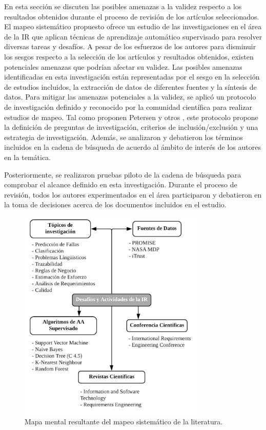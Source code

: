 \documentclass[journal]{IEEEtran}
\begin{document}
En esta sección se discuten las posibles amenazas a la validez respecto a los resultados obtenidos durante el proceso de revisión de los artículos seleccionados. El mapeo sistemático propuesto ofrece un estudio de las investigaciones en el área de la IR que aplican técnicas de aprendizaje automático supervisado para resolver diversas tareas y desafíos. A pesar de los esfuerzos de los autores para disminuir los sesgos respecto a la selección de los artículos y resultados obtenidos, existen potenciales amenazas que podrían afectar su validez. Las posibles amenazas identificadas en esta investigación están representadas por el sesgo en la selección de estudios incluidos, la extracción de datos de diferentes fuentes y la síntesis de datos. Para mitigar las amenazas potenciales a la validez, se aplicó un protocolo de investigación definido y reconocido por la comunidad científica para realizar estudios de mapeo. Tal como proponen Petersen y otros \cite{petersen2008systematic}, este protocolo propone la definición de preguntas de investigación, criterios de inclusión/exclusión y una estrategia de investigación. Además, se analizaron y debatieron los términos incluidos en la cadena de búsqueda de acuerdo al ámbito de interés de los autores en la temática.

Posteriormente, se realizaron pruebas piloto de la cadena de búsqueda para comprobar el alcance definido en esta investigación. Durante el proceso de revisión, todos los autores experimentados en el área participaron y debatieron en  la toma de decisiones acerca de los documentos incluidos en el estudio.


\begin{figure}[!t]
\centering
\includegraphics[width=3.5in]{figures/figure13_Guada.png}
\caption{Mapa mental resultante del mapeo sistemático de la literatura.}
\label{fig:13}
\end{figure}
\end{document}

